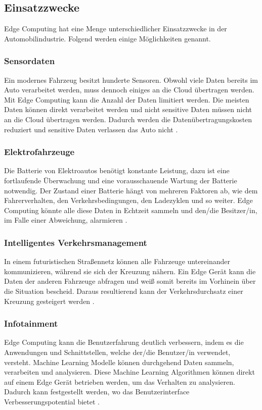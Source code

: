 \documentclass{sigchi}
\begin{document}
\subsection{Einsatzzwecke}
Edge Computing hat eine Menge unterschiedlicher Einsatzzwecke in der Automobilindustrie. Folgend werden einige Möglichkeiten genannt.

\subsubsection{Sensordaten}
Ein modernes Fahrzeug besitzt hunderte Sensoren. Obwohl viele Daten bereits im Auto verarbeitet werden, muss dennoch einiges an die Cloud übertragen werden. Mit Edge Computing kann die Anzahl der Daten limitiert werden. Die meisten Daten können direkt verarbeitet werden und nicht sensitive Daten müssen nicht an die Cloud übertragen werden. Dadurch werden die Datenübertragungskosten reduziert und sensitive Daten verlassen das Auto nicht \cite{role-edge-computing:2020}.

\subsubsection{Elektrofahrzeuge}
Die Batterie von Elektroautos benötigt konstante Leistung, dazu ist eine fortlaufende Überwachung und eine vorausschauende Wartung der Batterie notwendig. Der Zustand einer Batterie hängt von mehreren Faktoren ab, wie dem Fahrerverhalten, den Verkehrsbedingungen, den Ladezyklen und so weiter. Edge Computing könnte alle diese Daten in Echtzeit sammeln und den/die Besitzer/in, im Falle einer Abweichung, alarmieren \cite{role-edge-computing:2020}. 

\subsubsection{Intelligentes Verkehrsmanagement}
In einem futuristischen Straßennetz können alle Fahrzeuge untereinander kommunizieren, während sie sich der Kreuzung nähern. Ein Edge Gerät kann die Daten der anderen Fahrzeuge abfragen und weiß somit bereits im Vorhinein über die Situation bescheid. Daraus resultierend kann der Verkehrsdurchsatz einer Kreuzung gesteigert werden \cite{role-edge-computing:2020}.

\subsubsection{Infotainment}
Edge Computing kann die Benutzerfahrung deutlich verbessern, indem es die Anwendungen und Schnittstellen, welche der/die Benutzer/in verwendet, versteht. Machine Learning Modelle können durchgehend Daten sammeln, verarbeiten und analysieren. Diese Machine Learning Algorithmen können direkt auf einem Edge Gerät betrieben werden, um das Verhalten zu analysieren. Dadurch kann festgestellt werden, wo das Benutzerinterface Verbesserungspotential bietet \cite{role-edge-computing:2020}.
\end{document}
